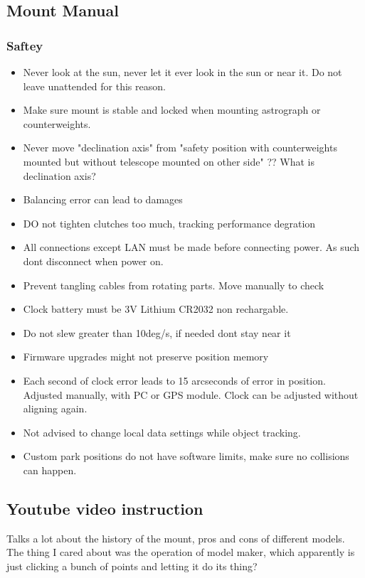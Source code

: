\documentclass[../main.tex]{subfiles}
\begin{document}
\subsection{Mount Manual}
\subsubsection{Saftey}
\begin{itemize}
    \item Never look at the sun, never let it ever look in the sun or near it. Do not leave unattended for this reason.
    \item Make sure mount is stable and locked when mounting astrograph or counterweights.
    \item Never move "declination axis" from "safety position with counterweights mounted but without telescope mounted on other side" ?? What is declination axis?
    \item Balancing error can lead to damages
    \item DO not tighten clutches too much, tracking performance degration
    \item All connections except LAN must be made before connecting power. As such dont disconnect when power on.
    \item Prevent tangling cables from rotating parts. Move manually to check
    \item Clock battery must be 3V Lithium CR2032 non rechargable.
    \item Do not slew greater than 10deg/s, if needed dont stay near it
    \item Firmware upgrades might not preserve position memory
    \item Each second of clock error leads to 15 arcseconds of error in position. Adjusted manually, with PC or GPS module. Clock can be adjusted without aligning again.
    \item Not advised to change local data settings while object tracking.
    \item Custom park positions do not have software limits, make sure no collisions can happen.
\end{itemize}
\subsection{Youtube video instruction}
Talks a lot about the history of the mount, pros and cons of different models. The thing I cared about was the operation of model maker, which apparently is just clicking a bunch of points and letting it do its thing?
\end{document}
